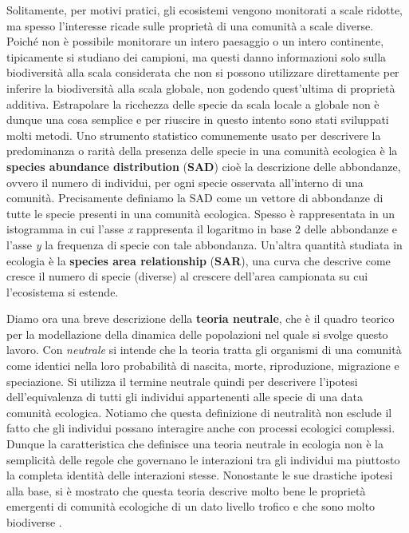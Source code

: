 Solitamente, per motivi pratici, gli ecosistemi vengono monitorati a scale ridotte, ma spesso l'interesse ricade sulle proprietà di una comunità a scale diverse.
Poiché non è possibile monitorare un intero paesaggio o un intero continente, tipicamente si studiano dei campioni, ma questi danno informazioni solo sulla biodiversità alla scala considerata che non si possono utilizzare direttamente per inferire la biodiversità alla scala globale, non godendo quest'ultima di proprietà additiva. Estrapolare la ricchezza delle specie da scala locale a globale non è dunque una cosa semplice e per riuscire in questo intento sono stati sviluppati molti metodi. Uno strumento statistico comunemente usato per descrivere la predominanza o rarità della presenza delle specie in una comunità ecologica è la \textbf{species abundance distribution} (\textbf{SAD}) cioè la descrizione delle abbondanze, ovvero il numero di individui, per ogni specie osservata all'interno di una comunità\cite{doi:McGill2007}. Precisamente definiamo la SAD come un vettore di abbondanze di tutte le specie presenti in una comunità ecologica. Spesso è rappresentata in un istogramma in cui l'asse \emph{x} rappresenta il logaritmo in base $2$ delle abbondanze e l'asse \emph{y} la frequenza di specie con tale abbondanza\cite{Preston}. Un'altra quantità studiata in ecologia è la \textbf{species area relationship} (\textbf{SAR}), una curva che descrive come cresce il numero di specie (diverse) al crescere dell'area campionata su cui l'ecosistema si estende.


Diamo ora una breve descrizione della \textbf{teoria neutrale}, che è il quadro teorico per la modellazione della dinamica delle popolazioni nel quale si svolge questo lavoro\cite{Hubbell}. Con \emph{neutrale} si intende che la teoria tratta gli organismi di una comunità come identici nella loro probabilità di nascita, morte, riproduzione, migrazione e speciazione. Si utilizza il termine neutrale quindi per descrivere l'ipotesi dell'equivalenza di tutti gli individui appartenenti alle specie di una data comunità ecologica. Notiamo che questa definizione di neutralità non esclude il fatto che gli individui possano interagire anche con processi ecologici complessi. Dunque la caratteristica che definisce una teoria neutrale in ecologia non è la semplicità delle regole che governano le interazioni tra gli individui ma piuttosto la completa identità delle interazioni stesse. Nonostante le sue drastiche ipotesi alla base, si è mostrato che questa teoria descrive molto bene le proprietà emergenti di comunità ecologiche di un dato livello trofico e che sono molto biodiverse \cite{2016AzaeleSuweis}.



